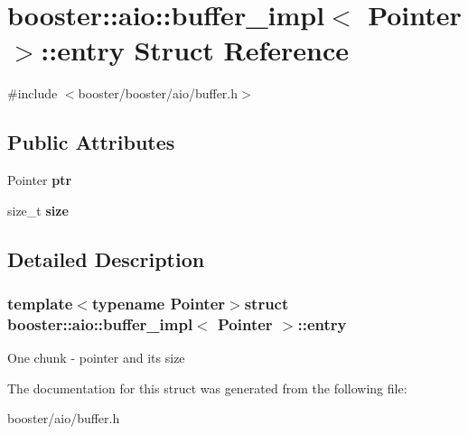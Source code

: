 \section{booster\-:\-:aio\-:\-:buffer\-\_\-impl$<$ \-Pointer $>$\-:\-:entry \-Struct \-Reference}
\label{structbooster_1_1aio_1_1buffer__impl_1_1entry}


{\ttfamily \#include $<$booster/booster/aio/buffer.\-h$>$}

\subsection*{\-Public \-Attributes}
\begin{DoxyCompactItemize}
\item 
\-Pointer {\bfseries ptr}\label{structbooster_1_1aio_1_1buffer__impl_1_1entry_af3b07e6e32ee1a03bd14d5845474b08e}

\item 
size\-\_\-t {\bfseries size}\label{structbooster_1_1aio_1_1buffer__impl_1_1entry_ad9c755195e7ff64956f764defa4206ec}

\end{DoxyCompactItemize}


\subsection{\-Detailed \-Description}
\subsubsection*{template$<$typename \-Pointer$>$struct booster\-::aio\-::buffer\-\_\-impl$<$ Pointer $>$\-::entry}

\-One chunk -\/ pointer and its size 

\-The documentation for this struct was generated from the following file\-:\begin{DoxyCompactItemize}
\item 
booster/aio/buffer.\-h\end{DoxyCompactItemize}
